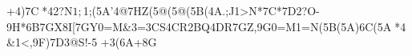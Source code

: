 +4)7C*42?N$1;$1;(5A'4@7HZ(5@(5@(5B(4A.;J1>N*7C*7D2?O-9H*6B7GX8I[7GY0=M&3=3CS4CR2BQ4DR7GZ,9G0=M1=N(5B(5A)6C(5A*4&1<,9F)7D3@S!-5 +3(6A+8G%